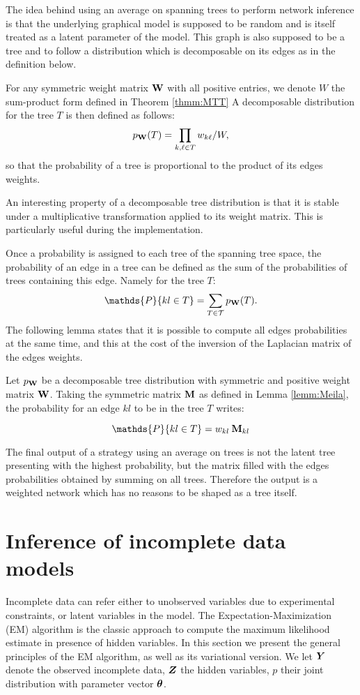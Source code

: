  The idea behind using an average on spanning trees to perform network inference  is that the underlying graphical model is supposed to be random and is itself treated as a latent parameter of the model. This graph is also supposed to be a tree and to follow a distribution which is decomposable on its edges as in the definition below.
\begin{definition}
For any symmetric weight matrix ${\bf W}$ with all positive entries, we denote $W$ the sum-product form defined in Theorem \ref{thmm:MTT} A decomposable  distribution for the tree $T$ is then defined as follows:
$$p_{{\bf W}}(T) = \prod_{k,\ell \in T} w_{k\ell} / W ,$$
so that the probability of a tree is proportional to the product of its edges weights.
\end{definition}

An interesting property of a decomposable tree distribution is that it is stable under a multiplicative transformation applied to its weight matrix. This is particularly useful during the implementation.

Once a probability is assigned to each tree of the spanning tree space, the probability of an edge in a tree can be defined as the sum of the probabilities of trees containing this edge. Namely for the tree $T$:
$$\mathds{P}\{kl\in T\} = \sum_{T\in \mathcal{T}} p_{\Wbf}(T).$$
The following lemma  states that it is possible to compute all edges probabilities at the same time, and this at the cost of the inversion of the  Laplacian matrix of the edges weights.

\begin{lemma}  \label{lem:Kirshner}
    Let $p_{{\bf W}}$ be a decomposable tree distribution with symmetric and positive weight matrix ${\bf W}$. Taking the symmetric matrix ${\bf M}$ as defined in Lemma  \ref{lemm:Meila}, the probability for an edge $kl$ to be in the tree $T$ writes:
 
$$\mathds{P}\{kl\in T\} =  w_{kl}\: \Mbf_{kl}$$
\end{lemma}

The final output of a strategy using an average on trees is not the latent tree presenting with the highest probability, but the matrix filled with the edges probabilities obtained by summing on all trees. Therefore the output is a weighted network which has no reasons to be shaped as a tree itself.

\section{Inference of incomplete data models}
Incomplete data can refer either to unobserved variables due to experimental constraints, or latent variables in the model. The Expectation-Maximization (EM) algorithm \citep{DLR77} is the classic approach to compute the maximum likelihood estimate in presence of hidden variables. In this section we present the general principles of the EM algorithm, as well as its variational version. We let ${\boldsymbol{Y}}$ denote the observed incomplete data, ${\boldsymbol{Z}}$ the hidden variables, $p$ their joint distribution with parameter vector ${\boldsymbol{\theta}}$.
 
